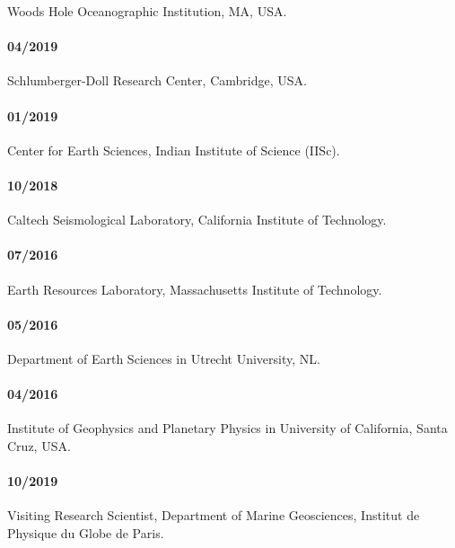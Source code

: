 \documentclass[9pt]{developercv} %
\begin{document}
Woods Hole
Oceanographic
Institution,
MA, USA.

\paragraph{04/2019}\label{section-11}

Schlumberger-Doll
Research
Center,
Cambridge,
USA.

\paragraph{01/2019}\label{section-12}

Center for
Earth
Sciences,
Indian
Institute
of Science
(IISc).

\paragraph{10/2018}\label{section-13}

Caltech
Seismological
Laboratory,
California
Institute
of
Technology.

\paragraph{07/2016}\label{section-14}

Earth
Resources
Laboratory,
Massachusetts
Institute
of
Technology.

\paragraph{05/2016}\label{section-15}

Department
of Earth
Sciences
in Utrecht
University,
NL.

\paragraph{04/2016}\label{section-16}

Institute
of
Geophysics
and
Planetary
Physics in
University
of
California,
Santa
Cruz, USA.

\label{short-term-academic-visits}

\paragraph{10/2019}\label{section-17}

Visiting
Research
Scientist,
Department
of Marine
Geosciences,
Institut
de
Physique
du Globe
de Paris.
\end{document}
